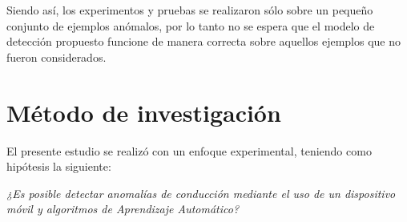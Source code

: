 \vspace{5mm} %

Siendo as\'{i}, los experimentos y pruebas se realizaron s\'{o}lo sobre un peque\~{n}o conjunto de ejemplos an\'{o}malos, por lo tanto no se espera que el modelo de detecci\'{o}n propuesto funcione de manera correcta sobre aquellos ejemplos que no fueron considerados.

\section{M\'{e}todo de investigaci\'{o}n}

El presente estudio se realiz\'{o} con un enfoque experimental, teniendo como hip\'{o}tesis la siguiente:


\begin{center}
\textit{\large{¿Es posible detectar anomal\'{i}as de conducci\'{o}n mediante el uso de un dispositivo móvil y algoritmos de Aprendizaje Autom\'{a}tico?}}
\end{center}

